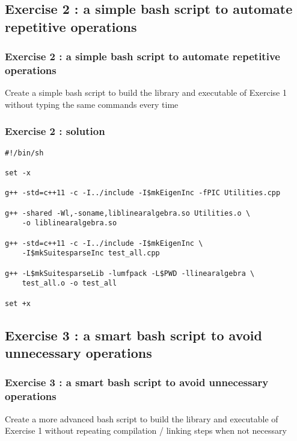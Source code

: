 \documentclass[9pt]{beamer}
\begin{document}
\subsection{Exercise 2 : a simple bash script to automate repetitive operations}
\begin{frame}\frametitle{Exercise 2 : a simple bash script to automate repetitive operations}
Create a simple bash script to build the library and executable of Exercise 1 without typing the same commands every time
\end{frame}

\begin{frame}[fragile]\frametitle{Exercise 2 : solution}
\begin{verbatim}
#!/bin/sh

set -x

g++ -std=c++11 -c -I../include -I$mkEigenInc -fPIC Utilities.cpp

g++ -shared -Wl,-soname,liblinearalgebra.so Utilities.o \
    -o liblinearalgebra.so
    
g++ -std=c++11 -c -I../include -I$mkEigenInc \
    -I$mkSuitesparseInc test_all.cpp
    
g++ -L$mkSuitesparseLib -lumfpack -L$PWD -llinearalgebra \
    test_all.o -o test_all

set +x
\end{verbatim}
\end{frame}



\subsection{Exercise 3 : a smart bash script to avoid unnecessary operations}
\begin{frame}\frametitle{Exercise 3 : a smart bash script to avoid unnecessary operations}
Create a more advanced bash script to build the library and executable of Exercise 1 without repeating compilation / linking steps when not necessary
\end{frame}
\end{document}
